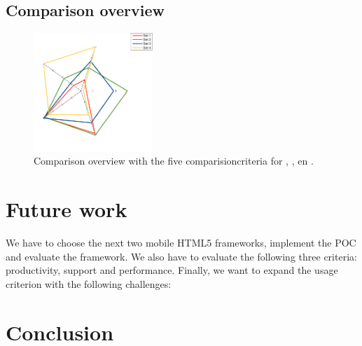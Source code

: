 \documentclass[a4paper]{artikel3}
\begin{document}

\subsection{Comparison overview} %
\label{sec:evaluation-overview}

\begin{figure}
  \centering
  \includegraphics[width=0.4\textwidth]{../Masterproef/figuren/spidergraph.pdf}
  \caption{Comparison overview with the five comparisioncriteria for \st{},  \kendo{},  \jqm{} en \lungo{}.}
  \label{fig:spidergraph}
\end{figure}



\section{Future work} %
\label{sec:future_work}
We have to choose the next two mobile HTML5 frameworks, implement the POC and evaluate the framework.
We also have to evaluate the following three criteria: productivity, support and performance. 
Finally, we want to expand the usage criterion with the following challenges:



\section{Conclusion} %
\label{sec:conclusion}




%


\end{document}
